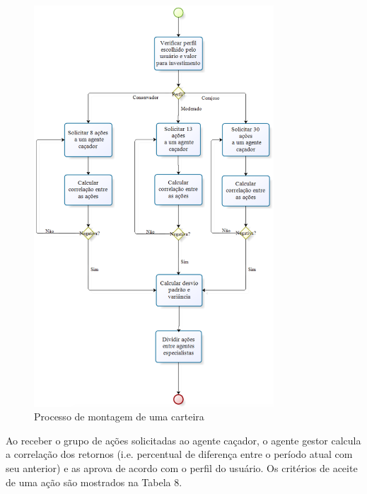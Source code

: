 \begin{description}
\begin{itemize}
\begin{figure}[h!]
\centering
\label{f23}
\includegraphics[width=0.8\textwidth]{figuras/f14}
\caption{Processo de montagem de uma carteira}

\end{figure}
\FloatBarrier

Ao receber o grupo de ações solicitadas ao agente caçador, o agente gestor calcula a correlação dos retornos (i.e. percentual de diferença entre o período atual com seu anterior) e as aprova de acordo com o perfil do usuário. Os critérios de aceite de uma ação são mostrados na Tabela 8.


\end{itemize}
\end{description}

